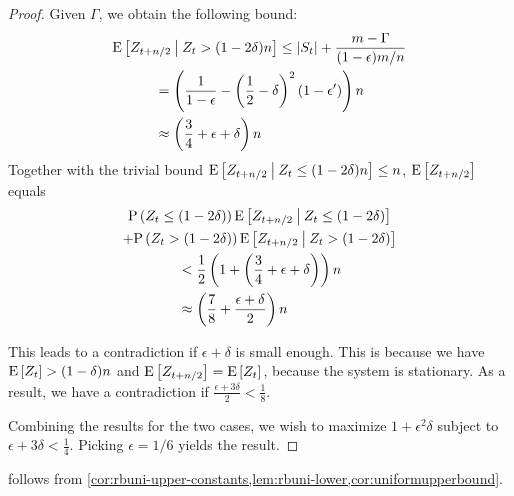 \begin{proof}
	Given $\Gamma$, we obtain the following bound:
	\begin{multline*}
		\mathrm{E}\left[Z_{t+n/2} \:\middle|\: Z_t > (1-2\delta)n\right] \le |S_t| + \frac{m-\Gamma}{(1-\epsilon)m/n} \\
		\begin{aligned} &= \left(\frac{1}{1-\epsilon} - \left(\frac{1}{2}-\delta\right)^2(1-\epsilon')\right) n \\
		&\approx \left(\frac{3}{4}+\epsilon+\delta\right) n \end{aligned}
	\end{multline*}
	Together with the trivial bound $\mathrm{E}\left[Z_{t+n/2} \:\middle|\: Z_t \le (1-2\delta)n\right]
	\le n$,  $\mathrm{E}\left[Z_{t+n/2}\right]$ equals
	\begin{multline*}
		\mathrm{P}\left(Z_t \le (1-2\delta)\right)\mathrm{E}\left[Z_{t+n/2} \:\middle|\: Z_t \le (1-2\delta)\right] \\
		+ \mathrm{P}\left(Z_t > (1-2\delta)\right)\mathrm{E}\left[Z_{t+n/2} \:\middle|\: Z_t > (1-2\delta)\right] \\
		\begin{aligned} &< \frac{1}{2} \left( 1 + \left(\frac{3}{4}+\epsilon+\delta\right) \right) n\\
		&\approx \left(\frac{7}{8} + \frac{\epsilon+\delta}{2}\right) n \end{aligned}
	\end{multline*}
		
	This leads to a contradiction if $\epsilon+\delta$ is small enough.  This
	is because we have $\mathrm{E}\left[Z_t\right] > (1-\delta)n$ and $\mathrm{E}\left[Z_{t+n/2}\right] = \mathrm{E}\left[Z_t\right]$,
	because the system is stationary.  As a result, we have a contradiction if
	$\frac{\epsilon+3\delta}{2} < \frac{1}{8}$.

	Combining the results for the two cases, we wish to maximize
	$1+\epsilon^2\delta$ subject to $\epsilon+3\delta < \frac{1}{4}.$ Picking
	$\epsilon = 1/6$ yields the result.
\end{proof}

 follows from
\cref{cor:rbuni-upper-constants,lem:rbuni-lower,cor:uniformupperbound}.


